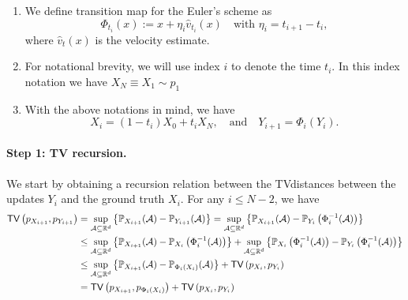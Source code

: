 \documentclass{article}
\theoremstyle{plain}
\theoremstyle{definition}
\theoremstyle{remark}
\def\bbR{\mathbb{R}}
\def\TV{{\sf TV}}
\begin{document}
\begin{enumerate}
    \item We define transition map for the Euler's scheme as 
\[
\Phi_{t_i}(x):= x + \eta_{i} \widehat{v}_{t_i}(x) \quad \text{with $\eta_{i} = t_{i+1} - t_i$},
\]
where $\widehat v_{t}(x)$ is the velocity estimate. 

\item For notational brevity, we will use index $i$ to denote the time $t_i$. In this index notation we have $X_N \equiv X_1 \sim p_1$ 

\item With the above notations in mind, we have 
\begin{equation}
\label{eq: interp in modified index}
X_i = (1-t_i)X_0 + t_iX_N, \quad \text{and}\quad Y_{i+1}=\Phi_{i}\left(Y_{i}\right).
\end{equation}
\end{enumerate}


\paragraph{Step 1: TV recursion.}
We start by obtaining a recursion relation between the \TV distances between the updates $Y_i$ and the ground truth $X_i$. For any $i \le N-2$, we have
\begin{equation}
\label{eq: TV recursion}
\begin{aligned}
\TV\left(p_{X_{i+1}}, p_{Y_{i+1}}\right) & =\sup _{\mathcal{A} \subseteq \bbR^d}\left\{\mathbb{P}_{X_{i+1}}(\mathcal{A})-\mathbb{P}_{Y_{i+1}}(\mathcal{A})\right\}=\sup _{\mathcal{A} \subseteq \bbR^d}\left\{\mathbb{P}_{X_{i+1}}(\mathcal{A})-\mathbb{P}_{Y_{i}}\left(\Phi_{i}^{-1}(\mathcal{A})\right)\right\} \\
& \leq \sup _{\mathcal{A} \subseteq \bbR^d}\left\{\mathbb{P}_{X_{i+1}}(\mathcal{A})-\mathbb{P}_{X_{i}}\left(\Phi_{i}^{-1}(\mathcal{A})\right)\right\}+\sup _{\mathcal{A} \subseteq \bbR^d}\left\{\mathbb{P}_{X_{i}}\left(\Phi_{i}^{-1}(\mathcal{A})\right)-\mathbb{P}_{Y_{i}}\left(\Phi_{i}^{-1}(\mathcal{A})\right)\right\}  \\
& \leq \sup _{\mathcal{A} \subseteq \bbR^d}\left\{\mathbb{P}_{X_{i+1}}(\mathcal{A})-\mathbb{P}_{\Phi_{i}\left(X_{i}\right)}(\mathcal{A})\right\}+\TV\left(p_{X_{i}}, p_{Y_{i}}\right) \\
& =\TV\left(p_{X_{i+1}}, p_{\Phi_{i}\left(X_{i}\right)}\right)+\TV\left(p_{X_{i}}, p_{Y_{i}}\right)
\end{aligned}
\end{equation}
\end{document}
